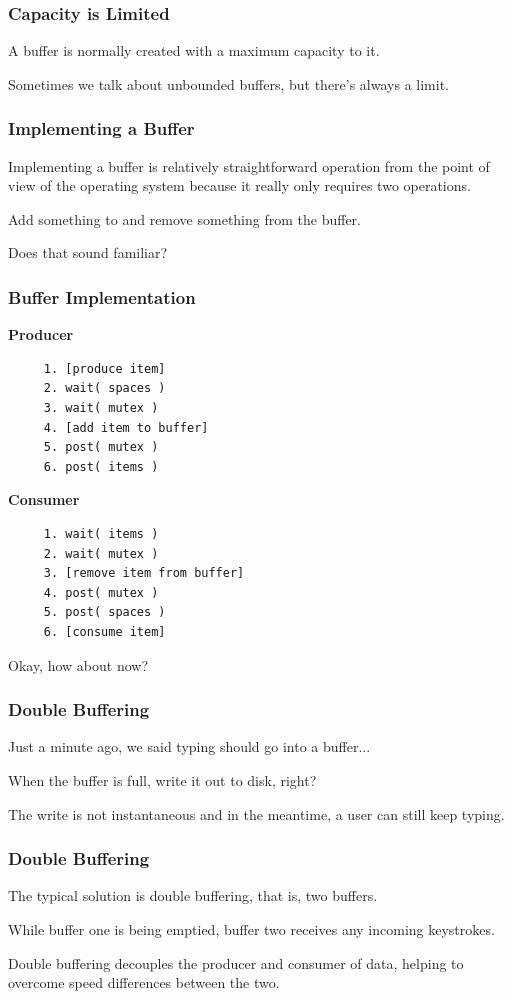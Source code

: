 \begin{frame}
\frametitle{Capacity is Limited}

A buffer is normally created with a maximum capacity to it.

Sometimes we talk about unbounded buffers, but there's always a limit.


\end{frame}



\begin{frame}
\frametitle{Implementing a Buffer}

Implementing a buffer is relatively straightforward operation from the point of view of the operating system because it really only requires two operations. 

Add something to and remove something from the buffer.

Does that sound familiar?

\end{frame}


\begin{frame}[fragile]
\frametitle{Buffer Implementation}

\begin{multicols}{2}
	\textbf{Producer}
	\begin{verbatim}
	 1. [produce item]
	 2. wait( spaces )
	 3. wait( mutex )
	 4. [add item to buffer]
	 5. post( mutex )
	 6. post( items )
  \end{verbatim}
	\columnbreak
	\textbf{Consumer}
	\begin{verbatim}
	 1. wait( items )
	 2. wait( mutex )
	 3. [remove item from buffer]
	 4. post( mutex )
	 5. post( spaces )
	 6. [consume item]
  \end{verbatim}
\end{multicols}

Okay, how about now?

\end{frame}


\begin{frame}
\frametitle{Double Buffering}

Just a minute ago, we said typing should go into a buffer...

When the buffer is full, write it out to disk, right?

The write is not instantaneous and in the meantime, a user can still keep typing. 


\end{frame}


\begin{frame}
\frametitle{Double Buffering}


The typical solution is \alert{double buffering}, that is, two buffers. 

While buffer one is being emptied, buffer two receives any incoming keystrokes. 

Double buffering decouples the producer and consumer of data, helping to overcome speed differences between the two.

\end{frame}


